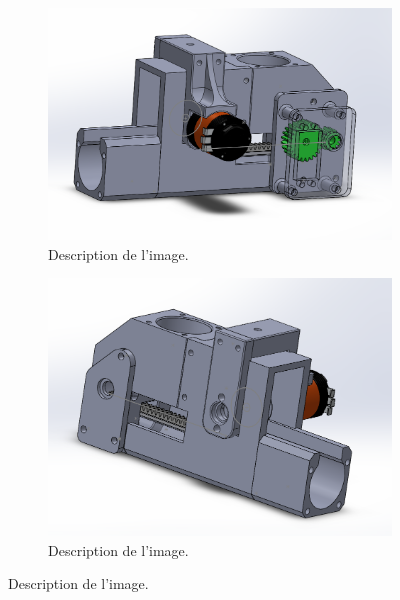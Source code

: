 \begin{figure}[h!]
    \centering

    \begin{subfigure}{0.4\linewidth}
        \centering
        \includegraphics[width=\linewidth]{img/s2/cad/lanceur1}
        \caption{Description de l'image.}
        \label{fig:a1-s2-cad-lanceur1}
    \end{subfigure}
    \begin{subfigure}{0.4\linewidth}
        \centering
        \includegraphics[width=\linewidth]{img/s2/cad/lanceur2}
        \caption{Description de l'image.}
        \label{fig:a1-s2-cad-lanceur2}
    \end{subfigure}

    \caption{Description de l'image.}
    \label{fig:template-example-flottante}
\end{figure}

